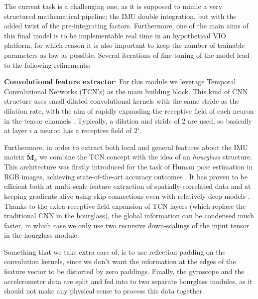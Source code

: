 The current task is a challenging one, as it is supposed to mimic a very structured mathematical pipeline; the IMU double integration, but with the added twist of the pre-integrating factors.
Furthermore, one of the main aims of this final model is to be implementable real time in an hypothetical VIO platform, for which reason it is also important to keep the number of trainable parameters as low as possible.
Several iterations of fine-tuning of the model lead to the following refinements:

\textbf{Convolutional feature extractor}: For this module we leverage Temporal Convolutional Networks (TCN's) as the main building block.
This kind of CNN structure uses small dilated convolutional kernels with the same stride as the dilation rate, with the aim of rapidly expanding the receptive field of each neuron in the tensor channels \cite{DBLP:journals/corr/abs-1811-10166}.
Typically, a dilation and stride of 2 are used, so basically at layer $i$ a neuron has a receptive field of $2^i$. 

Furthermore, in order to extract both local and general features about the IMU matrix $\mathbf{\tilde{M}}_k$ we combine the TCN concept with the idea of an \emph{hourglass} structure.
This architecture was firstly introduced for the task of Human pose estimation in RGB images, achieving state-of-the-art accuracy outcomes \cite{DBLP:journals/corr/NewellYD16}.
It has proven to be efficient both at multi-scale feature extraction of spatially-correlated data and at keeping gradients alive using skip connections even with relatively deep models \cite{DBLP:journals/corr/PavlakosZDD16}.
Thanks to the extra receptive field expansion of TCN layers (which replace the traditional CNN in the hourglass), the global information can be condensed much faster, in which case we only use two recursive down-scalings of the input tensor in the hourglass module.

Something that we take extra care of, is to use reflection padding on the convolution kernels, since we don't want the information at the edges of the feature vector to be distorted by zero paddings.
Finally, the gyroscope and the accelerometer data are split and fed into to two separate hourglass modules, as it should not make any physical sense to process this data together.

